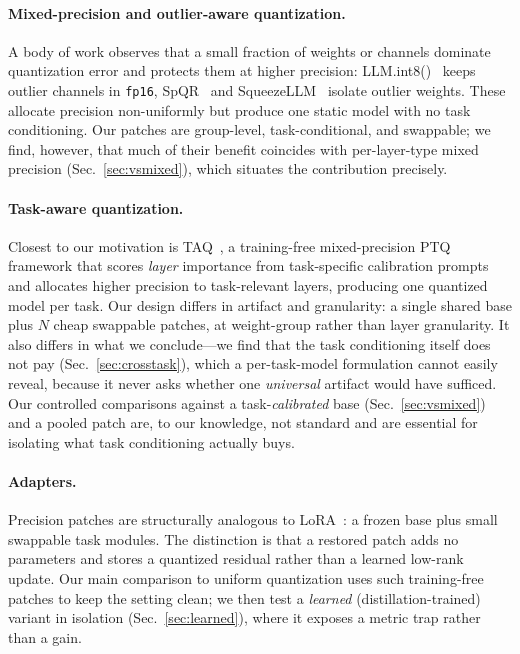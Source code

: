 \documentclass[manuscript, screen, review]{jair}
\newcommand{\code}[1]{\texttt{#1}}
\begin{document}
\paragraph{Mixed-precision and outlier-aware quantization.} A body of work
observes that a small fraction of weights or channels dominate quantization
error and protects them at higher precision: LLM.int8()~\cite{dettmers2022int8}
keeps outlier channels in \code{fp16}, SpQR~\cite{dettmers2023spqr} and
SqueezeLLM~\cite{kim2023squeezellm} isolate outlier weights. These allocate
precision non-uniformly but produce one static model with no task
conditioning. Our patches are group-level, task-conditional, and swappable; we
find, however, that much of their benefit coincides with per-layer-type mixed
precision (Sec.~\ref{sec:vsmixed}), which situates the contribution precisely.

\paragraph{Task-aware quantization.} Closest to our motivation is
TAQ~\cite{levi2025taq}, a training-free mixed-precision PTQ framework that
scores \emph{layer} importance from task-specific calibration prompts and
allocates higher precision to task-relevant layers, producing one quantized
model per task. Our design differs in artifact and granularity: a single shared
base plus $N$ cheap swappable patches, at weight-group rather than layer
granularity. It also differs in what we conclude---we find that the task
conditioning itself does not pay (Sec.~\ref{sec:crosstask}), which a
per-task-model formulation cannot easily reveal, because it never asks whether
one \emph{universal} artifact would have sufficed. Our controlled comparisons
against a task-\emph{calibrated} base (Sec.~\ref{sec:vsmixed}) and a pooled
patch are, to our knowledge, not standard and are essential for isolating what
task conditioning actually buys.

\paragraph{Adapters.} Precision patches are structurally analogous to
LoRA~\cite{hu2021lora}: a frozen base plus small swappable task modules. The
distinction is that a restored patch adds no parameters and stores a quantized
residual rather than a learned low-rank update. Our main comparison to uniform
quantization uses such training-free patches to keep the setting clean; we then
test a \emph{learned} (distillation-trained) variant in isolation
(Sec.~\ref{sec:learned}), where it exposes a metric trap rather than a gain.
\end{document}
